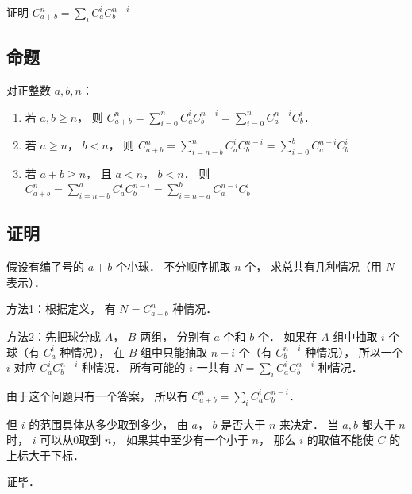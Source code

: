 

证明 $C_{a + b}^n = \sum_i C_a^i C_b^{n - i}$ 

\subsection{命题}
对正整数 $a,b,n$：
\begin{enumerate}
\item 若 $a,b \geqslant n$，  则 $C_{a + b}^n = \sum\limits_{i = 0}^n C_a^iC_b^{n - i}  = \sum\limits_{i = 0}^n C_a^{n - i} C_b^i$． 
\item 若 $a \geqslant n$，  $b < n$，   则  $C_{a + b}^n = \sum\limits_{i = n - b}^n C_a^iC_b^{n - i}  = \sum\limits_{i = 0}^b C_a^{n - i} C_b^i$ 
\item 若 $a + b \geqslant n$，   且 $a < n$，   $b < n$．  则  $C_{a + b}^n = \sum\limits_{i = n - b}^a C_a^i C_b^{n - i}  = \sum\limits_{i = n - a}^b C_a^{n - i} C_b^i$ 
\end{enumerate}

\subsection{证明}

假设有编了号的 $a+b$ 个小球． 不分顺序抓取 $n$ 个， 求总共有几种情况（用 $N$ 表示）．

方法1：根据定义， 有 $N = C_{a + b}^n$ 种情况．

方法2：先把球分成 $A$，  $B$ 两组， 分别有 $a$ 个和 $b$ 个． 如果在 $A$ 组中抽取 $i$ 个球（有 $C_a^i$ 种情况）， 在 $B$ 组中只能抽取  $n - i$ 个（有 $C_b^{n - i}$ 种情况）， 所以一个 $i$ 对应 $C_a^i C_b^{n - i}$ 种情况． 所有可能的 $i$ 一共有 $N = \sum_i C_a^i C_b^{n - i}$ 种情况．

由于这个问题只有一个答案， 所以有 $C_{a + b}^n = \sum_i C_a^i C_b^{n - i}$． 

但 $i$ 的范围具体从多少取到多少， 由 $a$，  $b$ 是否大于 $n$ 来决定． 当 $a,b$ 都大于 $n$ 时， $i$ 可以从0取到 $n$，  如果其中至少有一个小于 $n$，  那么 $i$ 的取值不能使 $C$ 的上标大于下标．

证毕．

